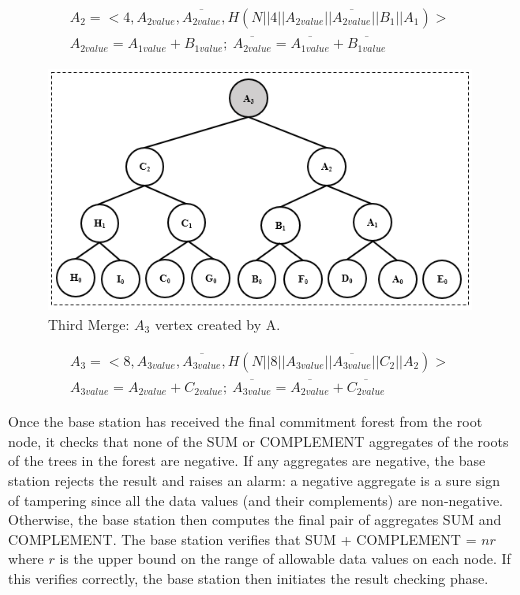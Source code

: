 		\begin{equation*}
			\begin{array}{l}
				A_{2} = <4, A_{2value}, \overline{A_{2value}}, H(N || 4 || A_{2value} || \overline{A_{2value}} || B_{1} ||A_{1}) >\\
				A_{2value} = A_{1value} + B_{1value};\ \overline{A_{2value}} = \overline{A_{1value}} + \overline{B_{1value}}
			\end{array}
		\end{equation*}
		\begin{figure}[h!]
			\centering
			\includegraphics{images/commitment-tree-example-4-shia.png}
			\caption{Third Merge: $A_{3}$ vertex created by A.}
			\label{fig:commitment-tree-example-4-shia}
		\end{figure}
		\begin{equation*}
			\begin{array}{l}
				A_{3} = <8, A_{3value}, \overline{A_{3value}}, H(N || 8 || A_{3value} || \overline{A_{3value}} || C_{2} ||A_{2}) >\\
				A_{3value} = A_{2value} + C_{2value};\ \overline{A_{3value}} = \overline{A_{2value}} + \overline{C_{2value}}
			\end{array}
		\end{equation*}
		
		Once the base station has received the final commitment forest from the root node, it checks that none of the SUM or COMPLEMENT aggregates of the roots of the trees in the forest are negative. 
		If any aggregates are negative, the base station rejects the result and raises an alarm: a negative aggregate is a sure sign of tampering since all the data values (and their complements) are non-negative. 
		Otherwise, the base station then computes the final pair of aggregates SUM and COMPLEMENT. 
		The base station verifies that SUM + COMPLEMENT = $nr$ where $r$ is the upper bound on the range of allowable data values on each node. 
		If this verifies correctly, the base station then initiates the result checking phase.

